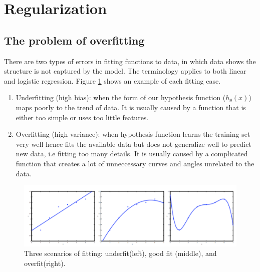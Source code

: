 \section{Regularization}
    \subsection{The problem of overfitting}
    There are two types of errors in fitting functions to data, in which data shows the structure is not captured by the model. The terminology applies to both linear and logistic regression. Figure \ref{fig:fitting} shows an example of each fitting case. 

            \begin{enumerate}
                \item Underfitting (high bias): when the form of our hypothesis function ($h_\theta (x)$) maps poorly to the trend of data. It is usually caused by a function that is either too simple or uses too little features. 
                \item Overfitting (high variance): when hypothesis function learns the training set very well hence fits the available data but does not generalize well to predict new data, i.e fitting too many details. It is usually caused by a complicated function that creates a lot of unneccessary curves and angles unrelated to the data. 
            \end{enumerate}
        
            \begin{figure}[htbp]
                \centering
                \includegraphics[width=\textwidth]{image/fitting.png}
                \caption{Three scenarios of fitting: underfit(left), good fit (middle), and overfit(right).}
                \label{fig:fitting}
            \end{figure}


